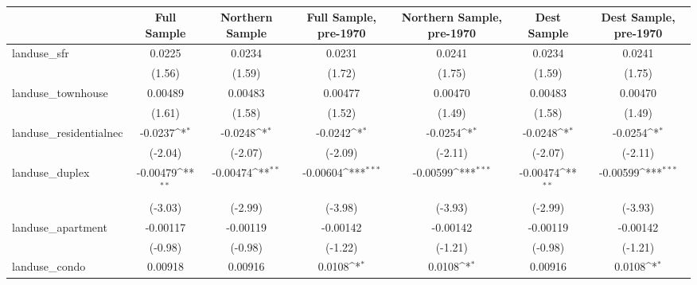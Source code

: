 \begin{table}[htbp]\centering
\def\sym#1{\ifmmode^{#1}\else\(^{#1}\)\fi}
\caption{ \label{tab1}}
\begin{tabular}{l*{6}{c}}
\toprule
                    &\multicolumn{1}{c}{Full Sample}&\multicolumn{1}{c}{Northern Sample}&\multicolumn{1}{c}{Full Sample, pre-1970}&\multicolumn{1}{c}{Northern Sample, pre-1970}&\multicolumn{1}{c}{Dest Sample}&\multicolumn{1}{c}{Dest Sample, pre-1970}\\
\midrule
landuse\_sfr         &      0.0225         &      0.0234         &      0.0231         &      0.0241         &      0.0234         &      0.0241         \\
                    &      (1.56)         &      (1.59)         &      (1.72)         &      (1.75)         &      (1.59)         &      (1.75)         \\
\addlinespace
landuse\_townhouse   &     0.00489         &     0.00483         &     0.00477         &     0.00470         &     0.00483         &     0.00470         \\
                    &      (1.61)         &      (1.58)         &      (1.52)         &      (1.49)         &      (1.58)         &      (1.49)         \\
\addlinespace
landuse\_residentialnec&     -0.0237\sym{*}  &     -0.0248\sym{*}  &     -0.0242\sym{*}  &     -0.0254\sym{*}  &     -0.0248\sym{*}  &     -0.0254\sym{*}  \\
                    &     (-2.04)         &     (-2.07)         &     (-2.09)         &     (-2.11)         &     (-2.07)         &     (-2.11)         \\
\addlinespace
landuse\_duplex      &    -0.00479\sym{**} &    -0.00474\sym{**} &    -0.00604\sym{***}&    -0.00599\sym{***}&    -0.00474\sym{**} &    -0.00599\sym{***}\\
                    &     (-3.03)         &     (-2.99)         &     (-3.98)         &     (-3.93)         &     (-2.99)         &     (-3.93)         \\
\addlinespace
landuse\_apartment   &    -0.00117         &    -0.00119         &    -0.00142         &    -0.00142         &    -0.00119         &    -0.00142         \\
                    &     (-0.98)         &     (-0.98)         &     (-1.22)         &     (-1.21)         &     (-0.98)         &     (-1.21)         \\
\addlinespace
landuse\_condo       &     0.00918         &     0.00916         &      0.0108\sym{*}  &      0.0108\sym{*}  &     0.00916         &      0.0108\sym{*}  \\

\end{tabular}
\end{table}
